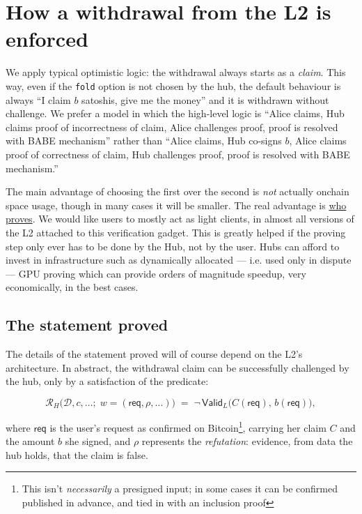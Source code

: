 \documentclass[11pt]{article}
\begin{document}
\section{How a withdrawal from the L2 is enforced}
\label{sec:statement}

We apply typical optimistic logic: the withdrawal always starts as a \emph{claim}. This way, even if the \texttt{fold} option is not chosen by the hub, the default behaviour is always ``I claim $b$ satoshis, give me the money'' and it is withdrawn without challenge. We prefer a model in which the high-level logic is ``Alice claims, Hub claims proof of incorrectness of claim, Alice challenges proof, proof is resolved with BABE mechanism'' rather than ``Alice claims, Hub co-signs $b$, Alice claims proof of correctness of claim, Hub challenges proof, proof is resolved with BABE mechanism.''

The main advantage of choosing the first over the second is \emph{not} actually onchain space usage, though in many cases it will be smaller. The real advantage is \underline{who proves}. We would like users to mostly act as light clients, in almost all versions of the L2 attached to this verification gadget. This is greatly helped if the proving step only ever has to be done by the Hub, not by the user. Hubs can afford to invest in infrastructure such as dynamically allocated --- i.e. used only in dispute --- GPU proving which can provide orders of magnitude speedup, very economically, in the best cases.

\subsection{The statement proved}

The details of the statement proved will of course depend on the L2's architecture. In abstract, the withdrawal claim can be successfully challenged by the hub, only by a satisfaction of the predicate:


\[
\mathcal{R}_H\big(\mathcal{D}, c, \ldots;\; w = (\mathsf{req}, \rho, \ldots)\big)
\;=\; \neg\,\mathsf{Valid}_L\big(C(\mathsf{req}),\, b(\mathsf{req})\big),
\]

where $\mathsf{req}$ is the user's request as confirmed on Bitcoin\footnote{This isn't \emph{necessarily} a presigned input; in some cases it can be confirmed published in advance, and tied in with an inclusion proof}, carrying
her claim $C$ and the amount $b$ she signed, and $\rho$ represents the \emph{refutation}:
evidence, from data the hub holds, that the claim is false. 
\end{document}
